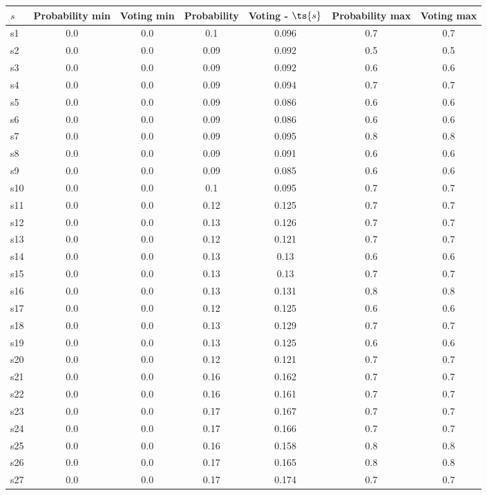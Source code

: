 \documentclass{article}
\begin{document}
\noindent\begin{tabular}{|l|c|c|c|c|c|c|}
\hline
$s$& Probability min & Voting min & Probability & Voting - $\ts{s}$ & Probability max & Voting max\\
\hline
s1 &0.0 & 0.0 & 0.1 & 0.096 & 0.7 & 0.7\\
\hline
s2 &0.0 & 0.0 & 0.09 & 0.092 & 0.5 & 0.5\\
\hline
s3 &0.0 & 0.0 & 0.09 & 0.092 & 0.6 & 0.6\\
\hline
s4 &0.0 & 0.0 & 0.09 & 0.094 & 0.7 & 0.7\\
\hline
s5 &0.0 & 0.0 & 0.09 & 0.086 & 0.6 & 0.6\\
\hline
s6 &0.0 & 0.0 & 0.09 & 0.086 & 0.6 & 0.6\\
\hline
s7 &0.0 & 0.0 & 0.09 & 0.095 & 0.8 & 0.8\\
\hline
s8 &0.0 & 0.0 & 0.09 & 0.091 & 0.6 & 0.6\\
\hline
s9 &0.0 & 0.0 & 0.09 & 0.085 & 0.6 & 0.6\\
\hline
s10 &0.0 & 0.0 & 0.1 & 0.095 & 0.7 & 0.7\\
\hline
s11 &0.0 & 0.0 & 0.12 & 0.125 & 0.7 & 0.7\\
\hline
s12 &0.0 & 0.0 & 0.13 & 0.126 & 0.7 & 0.7\\
\hline
s13 &0.0 & 0.0 & 0.12 & 0.121 & 0.7 & 0.7\\
\hline
s14 &0.0 & 0.0 & 0.13 & 0.13 & 0.6 & 0.6\\
\hline
s15 &0.0 & 0.0 & 0.13 & 0.13 & 0.7 & 0.7\\
\hline
s16 &0.0 & 0.0 & 0.13 & 0.131 & 0.8 & 0.8\\
\hline
s17 &0.0 & 0.0 & 0.12 & 0.125 & 0.6 & 0.6\\
\hline
s18 &0.0 & 0.0 & 0.13 & 0.129 & 0.7 & 0.7\\
\hline
s19 &0.0 & 0.0 & 0.13 & 0.125 & 0.6 & 0.6\\
\hline
s20 &0.0 & 0.0 & 0.12 & 0.121 & 0.7 & 0.7\\
\hline
s21 &0.0 & 0.0 & 0.16 & 0.162 & 0.7 & 0.7\\
\hline
s22 &0.0 & 0.0 & 0.16 & 0.161 & 0.7 & 0.7\\
\hline
s23 &0.0 & 0.0 & 0.17 & 0.167 & 0.7 & 0.7\\
\hline
s24 &0.0 & 0.0 & 0.17 & 0.166 & 0.7 & 0.7\\
\hline
s25 &0.0 & 0.0 & 0.16 & 0.158 & 0.8 & 0.8\\
\hline
s26 &0.0 & 0.0 & 0.17 & 0.165 & 0.8 & 0.8\\
\hline
s27 &0.0 & 0.0 & 0.17 & 0.174 & 0.7 & 0.7\\

\end{tabular}
\end{document}
